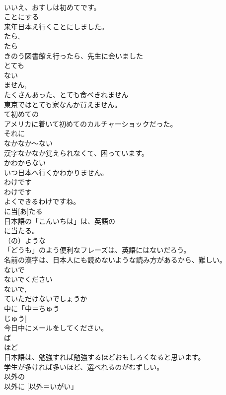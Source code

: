 \documentclass[8pt]{extreport}
\begin{document}
\begin{CJK}{UTF8}{min}
\\	いいえ、おすしは初めてです。
\\	ことにする	
\\	来年日本え行くことにしました。
\\	たら, 
\\	たら 
\\	きのう図書館え行ったら、先生に会いました 
\\	とても 
\\	ない 
\\	ません, 
\\	たくさんあった、とても食べきれません 
\\	東京ではとても家なんか買えません。
\\	て初めての
\\	アメリカに着いて初めてのカルチャーショックだった。
\\	それに	
\\	なかなか～ない	
\\	漢字なかなか覚えられなくて、困っています。
\\	かわからない	
\\	いつ日本へ行くかわかりません。
\\	わけです	
\\	わけです 
\\	よくできるわけですね。
\\	に当[あ]たる	
\\	日本語の「こんいちは」は、英語の 
\\	に当たる。
\\	（の）ような 
\\	「どうも」のよう便利なフレーズは、英語にはないだろう。
\\	名前の漢字は、日本人にも読めないような読み方があるから、難しい。
\\	ないで	
\\	ないでください 
\\	ないで, 
\\	ていただけないでしょうか	
\\	中に「中＝ちゅう 
\\	じゅう]	
\\	今日中にメールをしてください。
\\	ば 
\\	ほど	
\\	日本語は、勉強すれば勉強するほどおもしろくなると思います。
\\	学生が多ければ多いほど、選べれるのがむずしい。
\\	以外の 
\\	以外に [以外＝いがい」	

\end{CJK}
\end{document}
